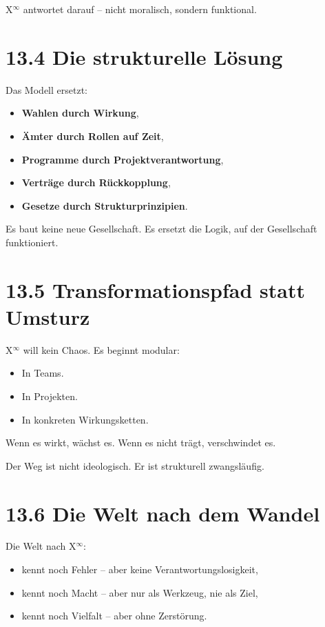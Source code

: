 \documentclass[12pt,a4paper]{book}
\begin{document}
X$^\infty$ antwortet darauf – nicht moralisch, sondern funktional.

\section*{13.4 Die strukturelle Lösung}

Das Modell ersetzt:

\begin{itemize}
    \item \textbf{Wahlen durch Wirkung},
    \item \textbf{Ämter durch Rollen auf Zeit},
    \item \textbf{Programme durch Projektverantwortung},
    \item \textbf{Verträge durch Rückkopplung},
    \item \textbf{Gesetze durch Strukturprinzipien}.
\end{itemize}

Es baut keine neue Gesellschaft.  
Es ersetzt die Logik, auf der Gesellschaft funktioniert.

\section*{13.5 Transformationspfad statt Umsturz}

X$^\infty$ will kein Chaos.  
Es beginnt modular:

\begin{itemize}
    \item In Teams.
    \item In Projekten.
    \item In konkreten Wirkungsketten.
\end{itemize}

Wenn es wirkt, wächst es.  
Wenn es nicht trägt, verschwindet es.

Der Weg ist nicht ideologisch.  
Er ist strukturell zwangsläufig.

\section*{13.6 Die Welt nach dem Wandel}

Die Welt nach X$^\infty$:

\begin{itemize}
    \item kennt noch Fehler – aber keine Verantwortungslosigkeit,
    \item kennt noch Macht – aber nur als Werkzeug, nie als Ziel,
    \item kennt noch Vielfalt – aber ohne Zerstörung.
\end{itemize}
\end{document}
